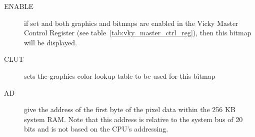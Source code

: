 \begin{description}
    \item[ENABLE] if set and both graphics and bitmaps are enabled in the Vicky Master Control Register (see table~\ref{tab:vky_master_ctrl_reg}), then this bitmap will be displayed.

    \item[CLUT] sets the graphics color lookup table to be used for this bitmap

    \item[AD] give the address of the first byte of the pixel data within the 256 KB system RAM. Note that this address is relative to the system bus of 20 bits and is not based on the CPU's addressing.
\end{description}
